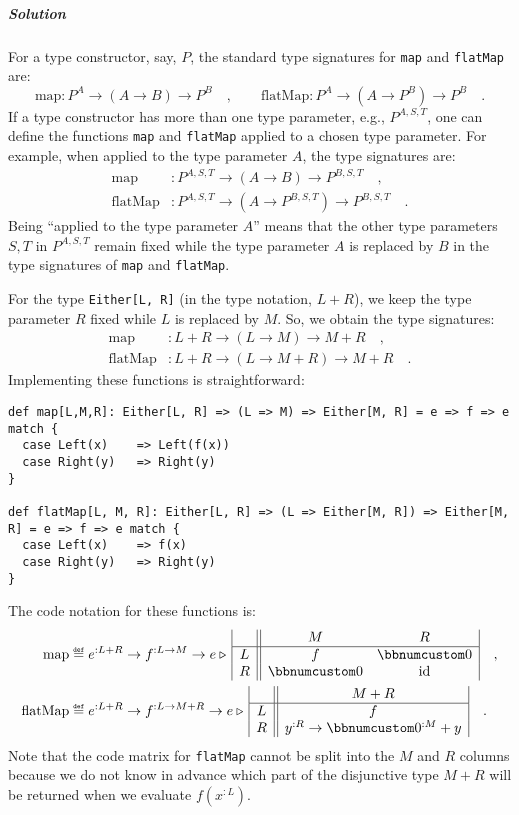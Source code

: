 \subparagraph{Solution}

For a type constructor, say, $P$, the standard type signatures for
\lstinline!map! and \lstinline!flatMap! are:
\[
\text{map}:P^{A}\rightarrow(A\rightarrow B)\rightarrow P^{B}\quad,\quad\quad\text{flatMap}:P^{A}\rightarrow(A\rightarrow P^{B})\rightarrow P^{B}\quad.
\]
If a type constructor has more than one type parameter, e.g., $P^{A,S,T}$,
one can define the functions \lstinline!map! and \lstinline!flatMap!
applied to a chosen type parameter. For example, when applied to the
type parameter $A$, the type signatures are:
\begin{align*}
\text{map} & :P^{A,S,T}\rightarrow(A\rightarrow B)\rightarrow P^{B,S,T}\quad,\\
\text{flatMap} & :P^{A,S,T}\rightarrow(A\rightarrow P^{B,S,T})\rightarrow P^{B,S,T}\quad.
\end{align*}
Being \textsf{``}applied to the type parameter $A$\textsf{''} means that the other
type parameters $S,T$ in $P^{A,S,T}$ remain fixed while the type
parameter $A$ is replaced by $B$ in the type signatures of \lstinline!map!
and \lstinline!flatMap!.

For the type \lstinline!Either[L, R]! (in the type notation, $L+R$),
we keep the type parameter $R$ fixed while $L$ is replaced by $M$.
So, we obtain the type signatures:
\begin{align*}
\text{map} & :L+R\rightarrow(L\rightarrow M)\rightarrow M+R\quad,\\
\text{flatMap} & :L+R\rightarrow(L\rightarrow M+R)\rightarrow M+R\quad.
\end{align*}
Implementing these functions is straightforward:
\begin{lstlisting}
def map[L,M,R]: Either[L, R] => (L => M) => Either[M, R] = e => f => e match {
  case Left(x)    => Left(f(x))
  case Right(y)   => Right(y)
}

def flatMap[L, M, R]: Either[L, R] => (L => Either[M, R]) => Either[M, R] = e => f => e match {
  case Left(x)    => f(x)
  case Right(y)   => Right(y)
}
\end{lstlisting}
The code notation for these functions is:
\begin{align*}
\text{map} & \triangleq e^{:L+R}\rightarrow f^{:L\rightarrow M}\rightarrow e\triangleright\,\begin{array}{|c||cc|}
 & M & R\\
\hline L & f & \bbnum 0\\
R & \bbnum 0 & \text{id}
\end{array}\quad,\\
\text{flatMap} & \triangleq e^{:L+R}\rightarrow f^{:L\rightarrow M+R}\rightarrow e\triangleright\,\begin{array}{|c||c|}
 & M+R\\
\hline L & f\\
R & y^{:R}\rightarrow\bbnum 0^{:M}+y
\end{array}\quad.
\end{align*}
Note that the code matrix for \lstinline!flatMap! cannot be split
into the $M$ and $R$ columns because we do not know in advance which
part of the disjunctive type $M+R$ will be returned when we evaluate
$f(x^{:L})$.

